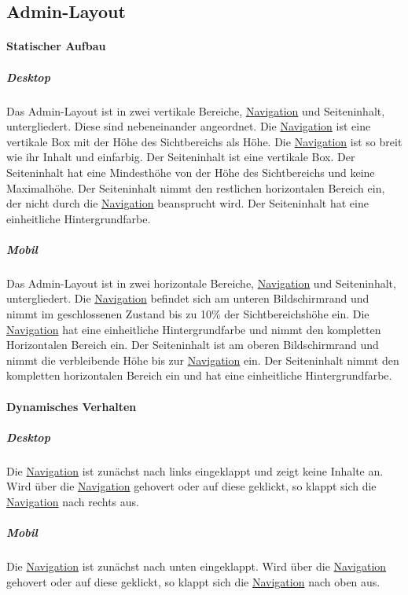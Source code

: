 \subsection{Admin-Layout}\label{AP_Admin_Layout}

\paragraph*{Statischer Aufbau}
\subparagraph*{Desktop}
Das Admin-Layout ist in zwei vertikale Bereiche, \hyperref[AP_Admin_Layout_Navigation]{Navigation} und Seiteninhalt, untergliedert. Diese sind nebeneinander angeordnet.
Die \hyperref[AP_Admin_Layout_Navigation]{Navigation} ist eine vertikale Box mit der Höhe des Sichtbereichs als Höhe.
Die \hyperref[AP_Admin_Layout_Navigation]{Navigation} ist so breit wie ihr Inhalt und einfarbig.
Der Seiteninhalt ist eine vertikale Box. Der Seiteninhalt hat eine Mindesthöhe von der Höhe des Sichtbereichs und keine Maximalhöhe.
Der Seiteninhalt nimmt den restlichen horizontalen Bereich ein, der nicht durch die \hyperref[AP_Admin_Layout_Navigation]{Navigation} beansprucht wird.
Der Seiteninhalt hat eine einheitliche Hintergrundfarbe.

\subparagraph*{Mobil}
Das Admin-Layout ist in zwei horizontale Bereiche, \hyperref[AP_Admin_Layout_Navigation]{Navigation} und Seiteninhalt, untergliedert.
Die \hyperref[AP_Admin_Layout_Navigation]{Navigation} befindet sich am unteren Bildschirmrand und nimmt im geschlossenen Zustand bis zu 10\% der Sichtbereichshöhe ein.
Die \hyperref[AP_Admin_Layout_Navigation]{Navigation} hat eine einheitliche Hintergrundfarbe und nimmt den kompletten Horizontalen Bereich ein.
Der Seiteninhalt ist am oberen Bildschirmrand und nimmt die verbleibende Höhe bis zur \hyperref[AP_Admin_Layout_Navigation]{Navigation} ein.
Der Seiteninhalt nimmt den kompletten horizontalen Bereich ein und hat eine einheitliche Hintergrundfarbe.

\paragraph*{Dynamisches Verhalten}
\subparagraph*{Desktop}
Die \hyperref[AP_Admin_Layout_Navigation]{Navigation} ist zunächst nach links eingeklappt und zeigt keine Inhalte an. Wird über die \hyperref[AP_Admin_Layout_Navigation]{Navigation} gehovert oder auf diese geklickt,
so klappt sich die \hyperref[AP_Admin_Layout_Navigation]{Navigation} nach rechts aus. 

\subparagraph*{Mobil}
Die \hyperref[AP_Admin_Layout_Navigation]{Navigation} ist zunächst nach unten eingeklappt. Wird über die \hyperref[AP_Admin_Layout_Navigation]{Navigation} gehovert oder auf diese geklickt,
so klappt sich die \hyperref[AP_Admin_Layout_Navigation]{Navigation} nach oben aus.

